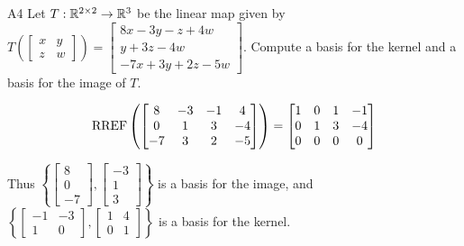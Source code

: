 \documentclass{sbgLAquiz}
\begin{document}
\begin{problem}{A4}
Let $T: \mathbb{R}^{2\times 2} \rightarrow \mathbb{R}^3$ be the linear map given by $T\left(\begin{bmatrix} x & y \\ z & w \end{bmatrix} \right) = \begin{bmatrix}  8x-3y-z+4w \\ y+3z-4w \\ -7x+3y+2z-5w\end{bmatrix} $.
Compute a basis for the kernel and a basis for the image of $T$.
\end{problem}
\begin{solution}
$$\operatorname{RREF} \left( \begin{bmatrix} 8 & -3 & -1 & 4 \\ 0 & 1 & 3 & -4 \\ -7 & 3 & 2 & -5 \end{bmatrix} \right) = \begin{bmatrix} 1 & 0 & 1 & -1 \\ 0 & 1 & 3 & -4 \\ 0 & 0 & 0 & 0 \end{bmatrix}$$

Thus \(\left\{ \begin{bmatrix} 8 \\ 0 \\ -7 \end{bmatrix}, \begin{bmatrix} -3 \\ 1 \\ 3 \end{bmatrix} \right\}\) is a basis for the image, and \( \left\{ \begin{bmatrix} -1 & -3 \\ 1 & 0 \end{bmatrix}, \begin{bmatrix} 1 & 4 \\ 0 & 1 \end{bmatrix} \right\} \) is a basis for the kernel.
\end{solution}
\end{document}
